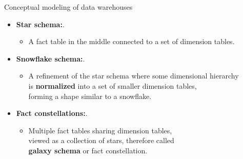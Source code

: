 \documentclass[aspectratio=169,t]{beamer}
\begin{document}
  { 
    \begin{frame}{Conceptual modeling of data warehouses}
        \begin{itemize}
            \item \textbf{Star schema:}.
            \begin{itemize}
                \item A fact table in the middle connected to a set of dimension tables.
            \end{itemize}
            \item \textbf{Snowflake schema:}.
            \begin{itemize}
                \item A refinement of the star schema where some dimensional hierarchy \\
                 is \textbf{normalized} into a set of smaller dimension tables,\\
                forming a shape similar to a snowflake.
            \end{itemize}
            \item \textbf{Fact constellations:}.
            \begin{itemize}
                \item Multiple fact tables sharing dimension tables, \\
                viewed as a collection of stars, therefore called \\
                \textbf{galaxy schema} or fact constellation.
            \end{itemize}
        \end{itemize}
    \end{frame}
  }
\end{document}
